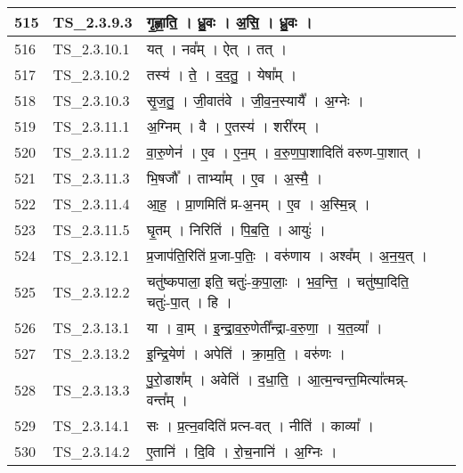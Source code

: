 \documentclass[17pt]{extarticle}
\begin{document}
\begin{longtable}{||p{0.4in}||p{0.9in}||p{4.0in}||p{0.9in}||}
        \hline
            515 & TS\_2.3.9.3 & गृ॒ह्णा॒ति॒   ।   ध्रु॒वः   ।   अ॒सि॒   ।   ध्रु॒वः   ।    &      \\
        \hline
            516 & TS\_2.3.10.1 & यत्   ।   नव᳚म्   ।   ऐत्   ।   तत्   ।    &      \\
        \hline
            517 & TS\_2.3.10.2 & तस्य॑   ।   ते॒   ।   द॒द॒तु॒   ।   येषा᳚म्   ।    &      \\
        \hline
            518 & TS\_2.3.10.3 & सृ॒ज॒तु॒   ।   जी॒वात॑वे   ।   जी॒व॒न॒स्यायै᳚   ।   अ॒ग्नेः   ।    &      \\
        \hline
            519 & TS\_2.3.11.1 & अ॒ग्निम्   ।   वै   ।   ए॒तस्य॑   ।   शरी॑रम्   ।    &      \\
        \hline
            520 & TS\_2.3.11.2 & वा॒रु॒णेन॑   ।   ए॒व   ।   ए॒न॒म्   ।   व॒रु॒ण॒पा॒शादिति॑ वरुण{-}पा॒शात्   ।    &      \\
        \hline
            521 & TS\_2.3.11.3 & भि॒षजौ᳚   ।   ताभ्या᳚म्   ।   ए॒व   ।   अ॒स्मै॒   ।    &      \\
        \hline
            522 & TS\_2.3.11.4 & आ॒ह॒   ।   प्रा॒णमिति॑ प्र{-}अ॒नम्   ।   ए॒व   ।   अ॒स्मि॒न्न्   ।    &      \\
        \hline
            523 & TS\_2.3.11.5 & घृ॒तम्   ।   निरिति॑   ।   पि॒ब॒ति॒   ।   आयुः॑   ।    &      \\
        \hline
            524 & TS\_2.3.12.1 & प्र॒जाप॑ति॒रिति॑ प्र॒जा{-}प॒तिः॒   ।   वरु॑णाय   ।   अश्व᳚म्   ।   अ॒न॒य॒त्   ।    &      \\
        \hline
            525 & TS\_2.3.12.2 & चतु॑ष्कपाला॒ इति॒ चतुः॑{-}क॒पा॒लाः॒   ।   भ॒व॒न्ति॒   ।   चतु॑ष्पा॒दिति॒ चतुः॑{-}पा॒त्   ।   हि   ।    &      \\
        \hline
            526 & TS\_2.3.13.1 & या   ।   वा॒म्   ।   इ॒न्द्रा॒व॒रु॒णेती᳚न्द्रा{-}व॒रु॒णा॒   ।   य॒त॒व्या᳚   ।    &      \\
        \hline
            527 & TS\_2.3.13.2 & इ॒न्द्रि॒येण॑   ।   अपेति॑   ।   क्रा॒म॒ति॒   ।   वरु॑णः   ।    &      \\
        \hline
            528 & TS\_2.3.13.3 & पु॒रो॒डाश᳚म्   ।   अवेति॑   ।   द॒धा॒ति॒   ।   आ॒त्म॒न्वन्त॒मित्या᳚त्मन्न्{-}वन्त᳚म्   ।    &      \\
        \hline
            529 & TS\_2.3.14.1 & सः   ।   प्र॒त्न॒वदिति॑ प्रत्न{-}वत्   ।   नीति॑   ।   काव्या᳚   ।    &      \\
        \hline
            530 & TS\_2.3.14.2 & ए॒तानि॑   ।   दि॒वि   ।   रो॒च॒नानि॑   ।   अ॒ग्निः   ।    &      \\

\end{longtable}
\end{document}
